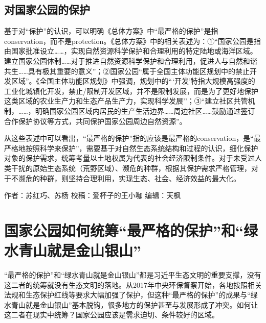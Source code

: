 \documentclass[]{book}
\begin{document}
\hypertarget{ux5bf9ux56fdux5bb6ux516cux56edux7684ux4fddux62a4}{%
\subsection{对国家公园的保护}\label{ux5bf9ux56fdux5bb6ux516cux56edux7684ux4fddux62a4}}

基于对``保护''的认识，可以明确《总体方案》中``最严格的保护''是指conservation，而不是protection。《总体方案》中的相关表述为：①``国家公园是指由国家批准设立\ldots{}\ldots{}，实现自然资源科学保护和合理利用的特定陆地或海洋区域。建立国家公园体制\ldots{}\ldots{}对于推进自然资源科学保护和合理利用，促进人与自然和谐共生\ldots{}\ldots{}具有极其重要的意义''；②国家公园``属于全国主体功能区规划中的禁止开发区域''。《全国主体功能区规划》中强调，规划中的```开发'特指大规模高强度的工业化城镇化开发，禁止/限制开发区域，并不是限制发展，而是为了更好地保护这类区域的农业生产力和生态产品生产力，实现科学发展''；③``建立社区共管机制，\ldots{}\ldots{}，明确国家公园区域内居民的生产生活边界\ldots{}\ldots{}周边社区\ldots{}\ldots{}鼓励通过签订合作保护协议等方式，共同保护国家公园周边自然资源''。

从这些表述中可以看出，``最严格的保护''指的应该是最严格的conservation，是``最严格地按照科学来保护''，需要基于对自然生态系统结构和过程的认识，细化保护对象的保护需求，统筹考量以土地权属为代表的社会经济限制条件。对于未受过人类干扰的原始生态系统（荒野区域）、濒危的种群，根据其保护需求严格管理，对于不濒危的种群，则坚持合理利用，实现生态、社会、经济效益的最大化。

作者：苏红巧、苏杨
校稿：爱杯子的王小咖
编辑：天枫

\hypertarget{ux56fdux5bb6ux516cux56edux5982ux4f55ux7edfux7b79ux6700ux4e25ux683cux7684ux4fddux62a4ux548cux7effux6c34ux9752ux5c71ux5c31ux662fux91d1ux5c71ux94f6ux5c71}{%
\section{国家公园如何统筹``最严格的保护''和``绿水青山就是金山银山''}\label{ux56fdux5bb6ux516cux56edux5982ux4f55ux7edfux7b79ux6700ux4e25ux683cux7684ux4fddux62a4ux548cux7effux6c34ux9752ux5c71ux5c31ux662fux91d1ux5c71ux94f6ux5c71}}

``最严格的保护''和``绿水青山就是金山银山''都是习近平生态文明的重要支撑，没有这二者的统筹就没有生态文明的落地。从2017年中央环保督察开始，各地按照相关法规和生态保护红线等要求大幅加强了保护，但这种``最严格的保护''的成果与``绿水青山就是金山银山''基本脱钩，很多地方的保护甚至与发展形成了冲突。如何让这二者在现实中统筹？国家公园应该是需求迫切、条件较好的区域。
\end{document}
